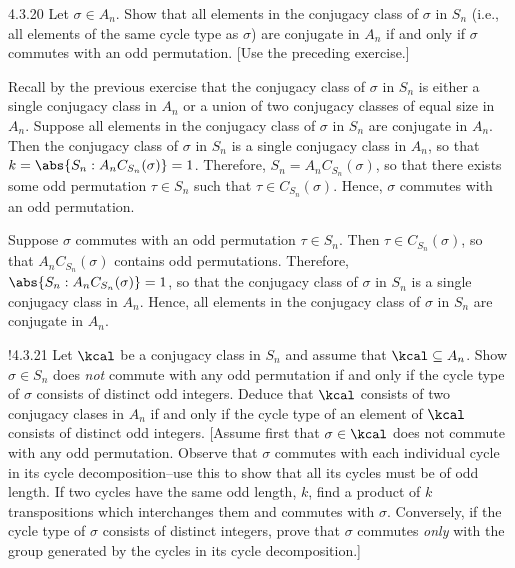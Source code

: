 \begin{exercise}{4.3.20}
	Let $\sigma \in A_n$.
	Show that all elements in the conjugacy class of $\sigma$ in $S_n$ (i.e., all elements of the same cycle type as $\sigma$) are conjugate in $A_n$ if and only if $\sigma$ commutes with an odd permutation. [Use the preceding exercise.]
\end{exercise}

\begin{soliff}
	\rightimp Recall by the previous exercise that the conjugacy class of $\sigma$ in $S_n$ is either a single conjugacy class in $A_n$ or a union of two conjugacy classes of equal size in $A_n$.
	Suppose all elements in the conjugacy class of $\sigma$ in $S_n$ are conjugate in $A_n$.
	Then the conjugacy class of $\sigma$ in $S_n$ is a single conjugacy class in $A_n$, so that $k = \abs{S_n : A_nC_{S_n}(\sigma)} = 1$.
	Therefore, $S_n = A_nC_{S_n}(\sigma)$, so that there exists some odd permutation $\tau \in S_n$ such that $\tau \in C_{S_n}(\sigma)$.
	Hence, $\sigma$ commutes with an odd permutation.

	\leftimp Suppose $\sigma$ commutes with an odd permutation $\tau \in S_n$.
	Then $\tau \in C_{S_n}(\sigma)$, so that $A_nC_{S_n}(\sigma)$ contains odd permutations.
	Therefore, $\abs{S_n : A_nC_{S_n}(\sigma)} = 1$, so that the conjugacy class of $\sigma$ in $S_n$ is a single conjugacy class in $A_n$.
	Hence, all elements in the conjugacy class of $\sigma$ in $S_n$ are conjugate in $A_n$.
\end{soliff}

\begin{exercise}!{4.3.21}
	Let $\kcal$ be a conjugacy class in $S_n$ and assume that $\kcal \subseteq A_n$.
	Show $\sigma \in S_n$ does \emph{not} commute with any odd permutation if and only if the cycle type of $\sigma$ consists of distinct odd integers.
	Deduce that $\kcal$ consists of two conjugacy clases in $A_n$ if and only if the cycle type of an element of $\kcal$ consists of distinct odd integers. [Assume first that $\sigma \in \kcal$ does not commute with any odd permutation.
	Observe that $\sigma$ commutes with each individual cycle in its cycle decomposition--use this to show that all its cycles must be of odd length.
	If two cycles have the same odd length, $k$, find a product of $k$ transpositions which interchanges them and commutes with $\sigma$.
	Conversely, if the cycle type of $\sigma$ consists of distinct integers, prove that $\sigma$ commutes \emph{only} with the group generated by the cycles in its cycle decomposition.]
\end{exercise}

